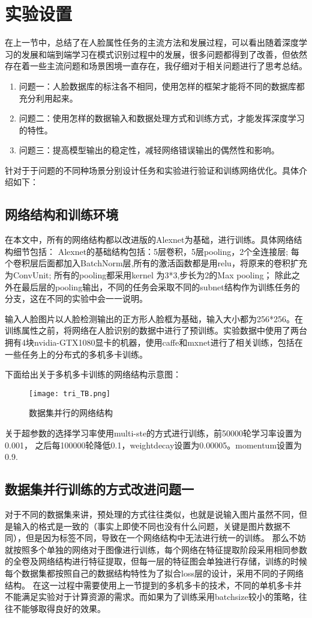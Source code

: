 \section{实验设置}
在上一节中，总结了在人脸属性任务的主流方法和发展过程，可以看出随着深度学习的发展和端到端学习在模式识别过程中的发展，很多问题都得到了改善，但依然存在着一些主流问题和场景困境一直存在，我仔细对于相关问题进行了思考总结。
\begin{enumerate}
\item 问题一：人脸数据库的标注各不相同，使用怎样的框架才能将不同的数据库都充分利用起来。
\item 问题二：使用怎样的数据输入和数据处理方式和训练方式，才能发挥深度学习的特性。
\item 问题三：提高模型输出的稳定性，减轻网络错误输出的偶然性和影响。
\end{enumerate}
针对于于问题的不同种场景分别设计任务和实验进行验证和训练网络优化。具体介绍如下：
\subsection{网络结构和训练环境}
在本文中，所有的网络结构都以改进版的Alexnet为基础，进行训练。具体网络结构细节包括：
Alexnet的基础结构包括：5层卷积，5层pooling，2个全连接层;
每个卷积层后面都加入BatchNorm层,所有的激活函数都是用relu，将原来的卷积扩充为ConvUnit;
所有的pooling都采用kernel 为3*3,步长为2的Max pooling；
除此之外在最后层的pooling输出，不同的任务会采取不同的subnet结构作为训练任务的分支，这在不同的实验中会一一说明。

输入人脸图片以人脸检测输出的正方形人脸框为基础，输入大小都为256*256。在训练属性之前，将网络在人脸识别的数据中进行了预训练。实验数据中使用了两台拥有4块nvidia-GTX1080显卡的机器，使用caffe和mxnet\cite{MXNET}进行了相关训练，包括在一些任务上的分布式的多机多卡训练。

下面给出关于多机多卡训练的网络结构示意图：
 \begin{figure}[!ht]
 \centering
	\texttt{[image: tri\_TB.png]}
	\caption{数据集并行的网络结构}
\end{figure}
关于超参数的选择学习率使用multi-ste的方式进行训练，前50000轮学习率设置为0.001，
之后每100000轮降低0.1，weightdecay设置为0.00005。momentum设置为0.9.

\subsection{数据集并行训练的方式改进问题一}
对于不同的数据集来讲，预处理的方式往往类似，也就是说输入图片虽然不同，但是输入的格式是一致的（事实上即使不同也没有什么问题，关键是图片数据不同），但是因为标签不同，导致在一个网络结构中无法进行统一的训练。
那么不妨就按照多个单独的网络对于图像进行训练，每个网络在特征提取阶段采用相同参数的全卷及网络结构进行特征提取，但每一层的特征图会单独进行存储，训练的时候每个数据集都按照自己的数据结构特性为了拟合loss层的设计，采用不同的子网络结构。	
在这一过程中需要使用上一节提到的多机多卡的技术，不同的单机多卡并不能满足实验对于计算资源的需求。而如果为了训练采用batchsize较小的策略，往往不能够取得良好的效果。

